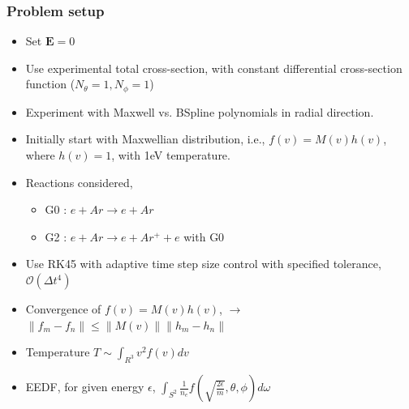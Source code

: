 \documentclass[mathserif, aspectratio=169]{beamer}
\newcommand{\vect}[1]{\boldsymbol{#1}}
\newcommand{\norm}[1]{\left\lVert#1\right\rVert}
\begin{document}
	\begin{frame}
		\frametitle{Problem setup}
		\begin{itemize}
			\item Set $\vect{E}=0$
			\item Use experimental total cross-section, with constant differential cross-section function ($N_\theta=1,N_\phi=1$)
			\item Experiment with Maxwell vs. BSpline polynomials in radial direction. 
			\item Initially start with Maxwellian distribution, i.e., $f(v)= M(v)h(v)$, where $h(v)=1$, with 1eV temperature.
			\item Reactions considered, 
			\begin{itemize}
				\item G0 : $e + Ar \rightarrow e + Ar$
				\item G2 : $e + Ar \rightarrow e + Ar^+ + e$ with G0
			\end{itemize}
			\item Use RK45 with adaptive time step size control with specified tolerance, $\mathcal{O}(\Delta t ^4)$
			\item Convergence of $f(v) = M(v) h(v)$,  $\rightarrow$ $\norm{f_{m}- f_{n}} \leq \norm{M(v)} \norm{h_m-h_n}$
			\item Temperature $T \sim \int_{R^3} v^2 f(v) dv$
			\item EEDF, for given energy $\epsilon$, $\int_{S^2} \frac{1}{n_e} f(\sqrt{\frac{2\epsilon}{m}},\theta,\phi) d\omega$
		\end{itemize}
	\end{frame}
\end{document}
